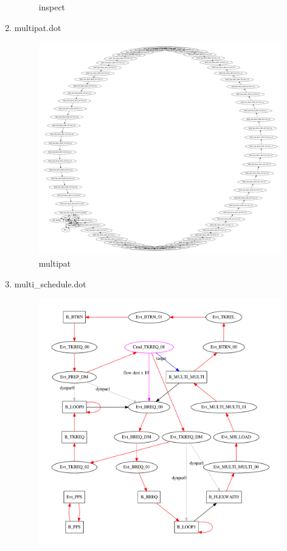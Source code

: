 \documentclass[12pt,a4paper]{report}
\begin{document}
\begin{enumerate}
\begin{figure}
        \caption{inspect}
        \label{fig:inspect}
    \end{figure}
\item multipat.dot
    \begin{figure}
        \centering 
        \includegraphics*[width=1.0\textwidth,keepaspectratio]{TestPattern/multipat.pdf}
        \caption{multipat}
        \label{fig:multipat}
    \end{figure}
\item multi\_schedule.dot
    \begin{figure}
        \centering 
        \includegraphics*[width=1.0\textwidth,keepaspectratio]{TestPattern/multi_schedule.pdf}

\end{figure}
\end{enumerate}
\end{document}
